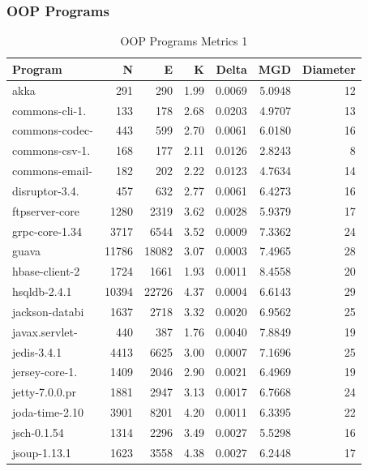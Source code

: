 \documentclass[12pt, a4paper]{article}
\begin{document}
\subsubsection{OOP Programs}
\begin{longtable}[H]{l r r r r r r}
    \caption{OOP Programs Metrics 1}\label{table:oop_metrics_1}\\
        Program &  N & E & K & Delta & MGD & Diameter\\
        \hline            
        \endhead
        akka           &   291 &   290 & 1.99 & 0.0069 & 5.0948 & 12 \\ 
        commons-cli-1. &   133 &   178 & 2.68 & 0.0203 & 4.9707 & 13 \\ 
        commons-codec- &   443 &   599 & 2.70 & 0.0061 & 6.0180 & 16 \\ 
        commons-csv-1. &   168 &   177 & 2.11 & 0.0126 & 2.8243 &  8 \\ 
        commons-email- &   182 &   202 & 2.22 & 0.0123 & 4.7634 & 14 \\ 
        disruptor-3.4. &   457 &   632 & 2.77 & 0.0061 & 6.4273 & 16 \\ 
        ftpserver-core &  1280 &  2319 & 3.62 & 0.0028 & 5.9379 & 17 \\ 
        grpc-core-1.34 &  3717 &  6544 & 3.52 & 0.0009 & 7.3362 & 24 \\ 
        guava          & 11786 & 18082 & 3.07 & 0.0003 & 7.4965 & 28 \\ 
        hbase-client-2 &  1724 &  1661 & 1.93 & 0.0011 & 8.4558 & 20 \\ 
        hsqldb-2.4.1   & 10394 & 22726 & 4.37 & 0.0004 & 6.6143 & 29 \\ 
        jackson-databi &  1637 &  2718 & 3.32 & 0.0020 & 6.9562 & 25 \\ 
        javax.servlet- &   440 &   387 & 1.76 & 0.0040 & 7.8849 & 19 \\ 
        jedis-3.4.1    &  4413 &  6625 & 3.00 & 0.0007 & 7.1696 & 25 \\ 
        jersey-core-1. &  1409 &  2046 & 2.90 & 0.0021 & 6.4969 & 19 \\ 
        jetty-7.0.0.pr &  1881 &  2947 & 3.13 & 0.0017 & 6.7668 & 24 \\ 
        joda-time-2.10 &  3901 &  8201 & 4.20 & 0.0011 & 6.3395 & 22 \\ 
        jsch-0.1.54    &  1314 &  2296 & 3.49 & 0.0027 & 5.5298 & 16 \\ 
        jsoup-1.13.1   &  1623 &  3558 & 4.38 & 0.0027 & 6.2448 & 17 \\ 

\end{longtable}
\end{document}
